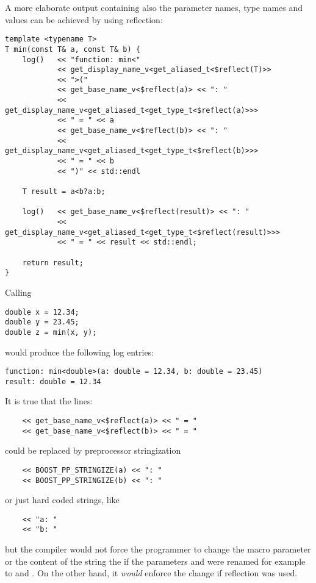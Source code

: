 A more elaborate output containing also the parameter names, type names and values
can be achieved by using reflection:

\begin{verbatim}
template <typename T>
T min(const T& a, const T& b) {
	log()   << "function: min<"
	        << get_display_name_v<get_aliased_t<$reflect(T)>>
	        << ">("
	        << get_base_name_v<$reflect(a)> << ": "
	        << get_display_name_v<get_aliased_t<get_type_t<$reflect(a)>>>
	        << " = " << a
	        << get_base_name_v<$reflect(b)> << ": "
	        << get_display_name_v<get_aliased_t<get_type_t<$reflect(b)>>>
	        << " = " << b
	        << ")" << std::endl

	T result = a<b?a:b;

	log()   << get_base_name_v<$reflect(result)> << ": "
	        << get_display_name_v<get_aliased_t<get_type_t<$reflect(result)>>>
	        << " = " << result << std::endl;

	return result;
}
\end{verbatim}

Calling

\begin{verbatim}
double x = 12.34;
double y = 23.45;
double z = min(x, y);
\end{verbatim}

would produce the following log entries:

\begin{verbatim}
function: min<double>(a: double = 12.34, b: double = 23.45)
result: double = 12.34
\end{verbatim}


It is true that the lines:
\begin{verbatim}
	<< get_base_name_v<$reflect(a)> << " = "
	<< get_base_name_v<$reflect(b)> << " = "
\end{verbatim}

could be replaced by preprocessor stringization

\begin{verbatim}
	<< BOOST_PP_STRINGIZE(a) << ": "
	<< BOOST_PP_STRINGIZE(b) << ": "
\end{verbatim}

or just hard coded strings, like

\begin{verbatim}
	<< "a: "
	<< "b: "
\end{verbatim}

but the compiler would not force the programmer to change the macro parameter
or the content of the string the if the parameters \verb@a@ and \verb@b@ were renamed
for example to \verb@first@ and \verb@second@. On the other hand, it {\em would}
enforce the change if reflection was used.

